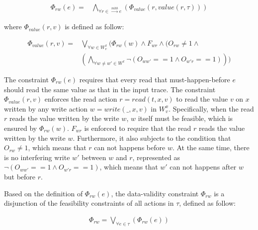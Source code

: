 \documentclass[preprint, numbers, 10pt]{sigplanconf}
\begin{document}
\begin{equation}
\begin{aligned}
\Phi_{rw}(e) ={} & \bigwedge_{\forall r\in \stackrel{mhb}{\longrightarrow} e} 
					(\Phi_{value}(r,value(r,\tau)))
\end{aligned}
\end{equation} 

where $\Phi_{value}(r,v)$ is defined as follow: 

\begin{equation}
\begin{aligned}
\Phi_{value}(r,v) ={} & \bigvee_{\forall w\in W_v^x} (\Phi_{rw}(w)\wedge F_{wr}\wedge 
					  (O_{rw}\neq 1\wedge \\
					& (\bigwedge_{\forall w\neq w'\in W^x}\neg (O_{ww'}==1\wedge O_{w'r}==1)))
\end{aligned}
\end{equation}

The constraint $\Phi_{rw}(e)$ requires that every read that must-happen-before 
$e$ should read the same value as that in the input trace. 
The constraint $\Phi_{value}(r,v)$ enforces the read action $r=read(t ,x,v)$ 
to read the value $v$ on $x$ written by any write action $w =write(\_,x,v)$ in $W^x_v$.
Specifically, when the read $r$ reads the value written by the write $w$,
$w$ itself must be feasible, which is ensured by $\Phi_{rw}(w)$. 
$F_{wr}$ is enforced to require that the read $r$ reads the value written by the write $w$. 
Furthermore, it also subjects to the condition that $O_{rw}\neq 1$, which means that $r$ can
not happens before $w$. %
At the same time, there is no interfering write $w'$ between $w$ and $r$, represented as 
$\neg (O_{ww'}==1\wedge O_{w'r}==1)$, which means that 
$w'$ can not happens after $w$ but before $r$.

Based on the definition of $\Phi_{rw}(e)$, the data-validity constraint $\Phi_{rw}$
is a disjunction of the feasibility constraints of all actions in $\tau$, defined as follow:

\begin{equation}
\begin{aligned}
\Phi_{rw} = \bigvee_{\forall e\in \tau} (\Phi_{rw}(e))
\end{aligned}
\end{equation} 
\end{document}

